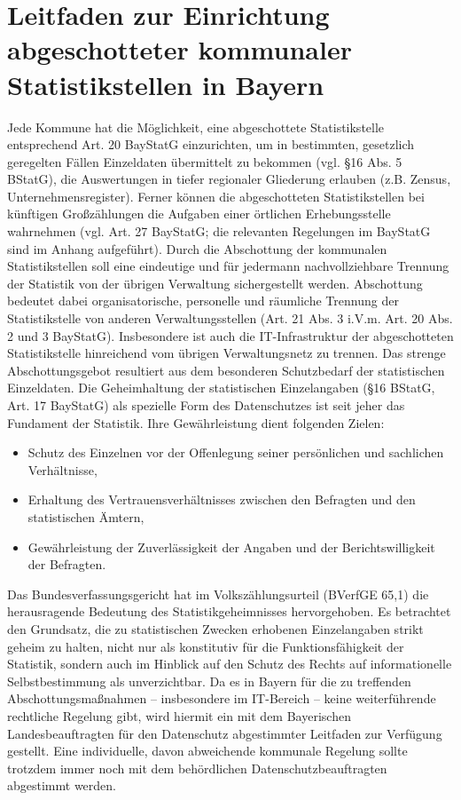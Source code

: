 \chapter{Leitfaden zur Einrichtung abgeschotteter kommunaler Statistikstellen in Bayern}
Jede Kommune hat die Möglichkeit, eine abgeschottete Statistikstelle entsprechend Art. 20 BayStatG einzurichten, um in bestimmten, gesetzlich geregelten Fällen Einzeldaten übermittelt zu bekommen (vgl. \S 16 Abs. 5 BStatG), die Auswertungen in tiefer regionaler Gliederung erlauben (z.B. Zensus, Unternehmensregister). Ferner können die abgeschotteten Statistikstellen bei künftigen Großzählungen die Aufgaben einer örtlichen Erhebungsstelle wahrnehmen (vgl. Art. 27 BayStatG; die relevanten Regelungen im BayStatG sind im Anhang aufgeführt). Durch die Abschottung der kommunalen Statistikstellen soll eine eindeutige und für jedermann nachvollziehbare Trennung der Statistik von der übrigen Verwaltung sichergestellt werden. Abschottung bedeutet dabei organisatorische, personelle und räumliche Trennung der Statistikstelle von anderen Verwaltungsstellen (Art. 21 Abs. 3 i.V.m. Art. 20 Abs. 2 und 3 BayStatG). Insbesondere ist auch die IT-Infrastruktur der abgeschotteten Statistikstelle hinreichend vom übrigen Verwaltungsnetz zu trennen. Das strenge Abschottungsgebot resultiert aus dem besonderen Schutzbedarf der statistischen Einzeldaten. Die Geheimhaltung der statistischen Einzelangaben (\S 16 BStatG, Art. 17 BayStatG) als spezielle Form des Datenschutzes ist seit jeher das Fundament der Statistik. Ihre Gewährleistung dient folgenden Zielen:
\begin{itemize}
    \item Schutz des Einzelnen vor der Offenlegung seiner persönlichen und sachlichen Verhältnisse,
    \item Erhaltung des Vertrauensverhältnisses zwischen den Befragten und den statistischen Ämtern,
    \item Gewährleistung der Zuverlässigkeit der Angaben und der Berichtswilligkeit der Befragten.
\end{itemize}
Das Bundesverfassungsgericht hat im Volkszählungsurteil (BVerfGE 65,1) die herausragende Bedeutung des Statistikgeheimnisses hervorgehoben. Es betrachtet den Grundsatz, die zu statistischen Zwecken erhobenen Einzelangaben strikt geheim zu halten, nicht nur als konstitutiv für die Funktionsfähigkeit der Statistik, sondern auch im Hinblick auf den Schutz des Rechts auf informationelle Selbstbestimmung als unverzichtbar.
Da es in Bayern für die zu treffenden Abschottungsmaßnahmen  -- insbesondere im IT-Bereich -- keine weiterführende rechtliche Regelung gibt, wird hiermit ein mit dem Bayerischen Landesbeauftragten für den Datenschutz abgestimmter Leitfaden zur Verfügung gestellt. Eine individuelle, davon abweichende kommunale Regelung sollte trotzdem immer noch mit dem behördlichen Datenschutzbeauftragten abgestimmt werden. 
